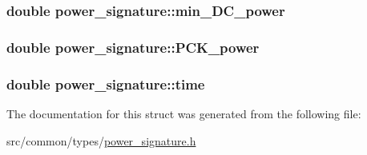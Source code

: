 \subsubsection[{\texorpdfstring{min\+\_\+\+D\+C\+\_\+power}{min_DC_power}}]{\setlength{\rightskip}{0pt plus 5cm}double power\+\_\+signature\+::min\+\_\+\+D\+C\+\_\+power}\hypertarget{structpower__signature_ad591c63af76defd51436659718293448}{}\label{structpower__signature_ad591c63af76defd51436659718293448}
\subsubsection[{\texorpdfstring{P\+C\+K\+\_\+power}{PCK_power}}]{\setlength{\rightskip}{0pt plus 5cm}double power\+\_\+signature\+::\+P\+C\+K\+\_\+power}\hypertarget{structpower__signature_a0cda14ce59849720a91b070f6f95421e}{}\label{structpower__signature_a0cda14ce59849720a91b070f6f95421e}
\subsubsection[{\texorpdfstring{time}{time}}]{\setlength{\rightskip}{0pt plus 5cm}double power\+\_\+signature\+::time}\hypertarget{structpower__signature_a8b95e3a5849d61bb32ee86ee01f6a6da}{}\label{structpower__signature_a8b95e3a5849d61bb32ee86ee01f6a6da}


The documentation for this struct was generated from the following file\+:\begin{DoxyCompactItemize}
\item 
src/common/types/\hyperlink{power__signature_8h}{power\+\_\+signature.\+h}\end{DoxyCompactItemize}
